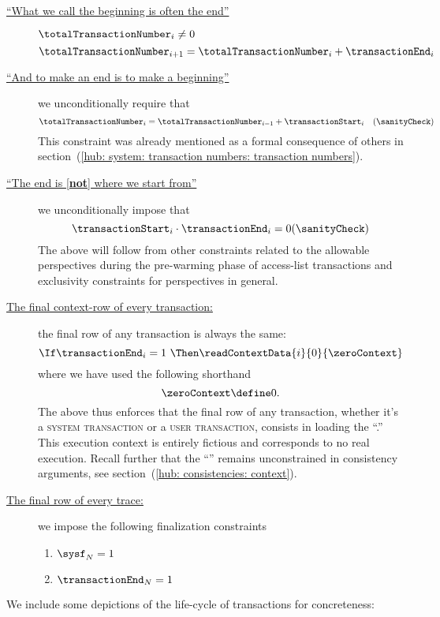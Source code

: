 \begin{description}
	\item[\underline{``What we call the beginning is often the end''}]
		\label{hub: system: transaction numbers: housekeeping: transactions must end}
		\If $\totalTransactionNumber _{i} \neq 0$ \Then
		\[
			\totalTransactionNumber _{i + 1} = \totalTransactionNumber _{i} +  \transactionEnd _{i}
		\]
	\item[\underline{``And to make an end is to make a beginning''}]
		\label{hub: system: transaction numbers: housekeeping: transactions must start}
		we unconditionally require that
		\[
			\totalTransactionNumber _{i} = \totalTransactionNumber _{i - 1} + \transactionStart _{i}
			\quad (\sanityCheck)
		\]
		\saNote{}
		This constraint was already mentioned as a formal consequence of others in
		section~(\ref{hub: system: transaction numbers: transaction numbers}).
	\item[\underline{``The end is [\textbf{not}] where we start from''}]
		\label{hub: system: transaction numbers: housekeeping: transactions don't start and end at the same time}
		we unconditionally impose that
		\[
			\transactionStart _{i} \cdot \transactionEnd _{i} = 0 (\sanityCheck)
		\]
		\saNote{}
		The above will follow from other constraints related to
		the allowable perspectives during the pre-warming phase of access-list transactions
		and exclusivity constraints for perspectives in general.
		\specTodo{}
	\item[\underline{The final context-row of every transaction:}]
		\label{hub: system: transaction numbers: housekeeping: transactions end by loading the zero context}
		the final row of any transaction is always the same:
		\[
			\If \transactionEnd _{i} = 1
			~ \Then \readContextData {i}{0}{\zeroContext}
		\]
		where we have used the following shorthand
		\[
			\zeroContext \define 0.
		\]
		\saNote{}
		The above thus enforces that the final row of any transaction,
		whether it's a \textsc{system transaction} or a \textsc{user transaction},
		consists in loading the ``\zeroContext{}.''
		This execution context is entirely fictious and corresponds to no real execution.
		Recall further that the ``\zeroContext{}'' remains unconstrained in consistency arguments,
		see section~(\ref{hub: consistencies: context}).
	\item[\underline{The final row of every trace:}]
		\label{hub: system: transaction numbers: housekeeping: finalization constraint of trace}
		we impose the following finalization constraints
		\begin{enumerate}
			\item $\sysf           _{N} = 1$
			\item $\transactionEnd _{N} = 1$
		\end{enumerate}
\end{description}
We include some depictions of the life-cycle of transactions for concreteness:
